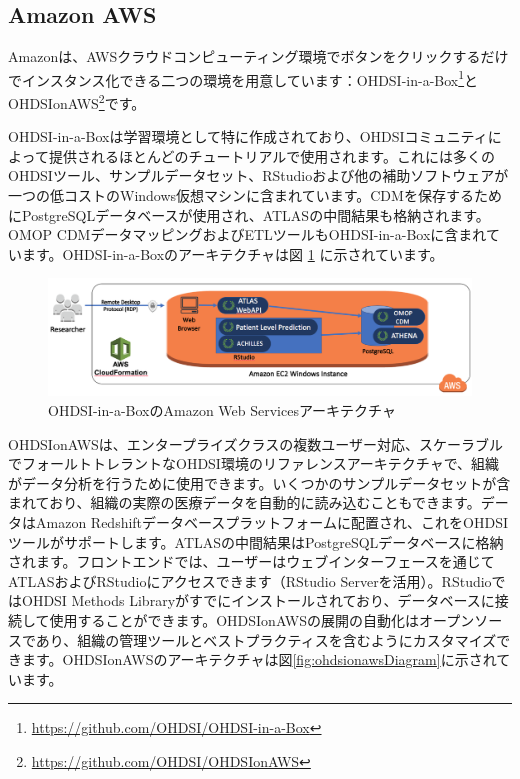 \documentclass[
  11pt]{book}
\theoremstyle{definition}
\theoremstyle{definition}
\theoremstyle{definition}
\theoremstyle{definition}
\theoremstyle{remark}
\begin{document}
\subsection{Amazon AWS}\label{amazon-aws}

Amazonは、AWSクラウドコンピューティング環境でボタンをクリックするだけでインスタンス化できる二つの環境を用意しています：OHDSI-in-a-Box\footnote{\url{https://github.com/OHDSI/OHDSI-in-a-Box}}とOHDSIonAWS\footnote{\url{https://github.com/OHDSI/OHDSIonAWS}}です。 

OHDSI-in-a-Boxは学習環境として特に作成されており、OHDSIコミュニティによって提供されるほとんどのチュートリアルで使用されます。これには多くのOHDSIツール、サンプルデータセット、RStudioおよび他の補助ソフトウェアが一つの低コストのWindows仮想マシンに含まれています。CDMを保存するためにPostgreSQLデータベースが使用され、ATLASの中間結果も格納されます。OMOP CDMデータマッピングおよびETLツールもOHDSI-in-a-Boxに含まれています。OHDSI-in-a-Boxのアーキテクチャは図 \ref{fig:ohdsiinaboxDiagram} に示されています。

\begin{figure}

{\centering \includegraphics[width=1\linewidth]{images/OhdsiAnalyticsTools/OHDSI-in-a-BoxDiagram} 

}

\caption{OHDSI-in-a-BoxのAmazon Web Servicesアーキテクチャ}\label{fig:ohdsiinaboxDiagram}
\end{figure}

OHDSIonAWSは、エンタープライズクラスの複数ユーザー対応、スケーラブルでフォールトトレラントなOHDSI環境のリファレンスアーキテクチャで、組織がデータ分析を行うために使用できます。いくつかのサンプルデータセットが含まれており、組織の実際の医療データを自動的に読み込むこともできます。データはAmazon Redshiftデータベースプラットフォームに配置され、これをOHDSIツールがサポートします。ATLASの中間結果はPostgreSQLデータベースに格納されます。フロントエンドでは、ユーザーはウェブインターフェースを通じてATLASおよびRStudioにアクセスできます（RStudio Serverを活用）。RStudioではOHDSI Methods Libraryがすでにインストールされており、データベースに接続して使用することができます。OHDSIonAWSの展開の自動化はオープンソースであり、組織の管理ツールとベストプラクティスを含むようにカスタマイズできます。OHDSIonAWSのアーキテクチャは図\ref{fig:ohdsionawsDiagram}に示されています。
\end{document}

